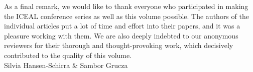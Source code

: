 \documentclass[output=paper]{langsci/langscibook}
\begin{document}
As a final remark, we would like to thank everyone who participated in making the ICEAL conference series as well as this volume possible. The authors of the individual articles put a lot of time and effort into their papers, and it was a pleasure working with them. We are also deeply indebted to our anonymous reviewers for their thorough and thought-provoking work, which decisively contributed to the quality of this volume.\\

Silvia Hansen-Schirra \& Sambor Grucza




\printbibliography[heading=subbibliography,notkeyword=this]
\end{document}
